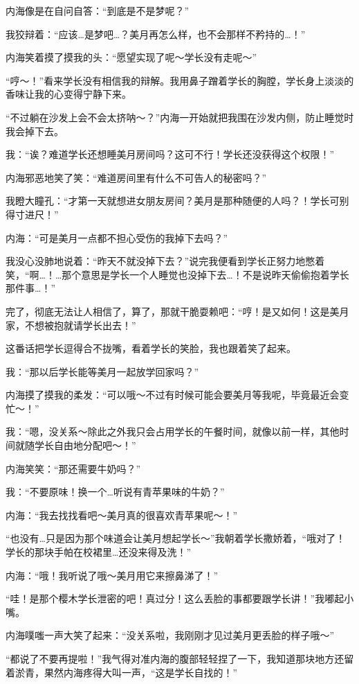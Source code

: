 内海像是在自问自答：“到底是不是梦呢？”

我狡辩着：“应该…是梦吧…？美月再怎么样，也不会那样不矜持的…！”

内海笑着摸了摸我的头：“愿望实现了呢～学长没有走呢～”

“哼～！”看来学长没有相信我的辩解。我用鼻子蹭着学长的胸膛，学长身上淡淡的香味让我的心变得宁静下来。

“不过躺在沙发上会不会太挤呐～？”内海一开始就把我围在沙发内侧，防止睡觉时我会掉下去。

我：“诶？难道学长还想睡美月房间吗？这可不行！学长还没获得这个权限！”

内海邪恶地笑了笑：“难道房间里有什么不可告人的秘密吗？”

我瞪大瞳孔：“才第一天就想进女朋友房间？美月是那种随便的人吗？！学长可别得寸进尺！”

内海：“可是美月一点都不担心受伤的我掉下去吗？”

我没心没肺地说着：“昨天不就没掉下去？”说完我便看到学长正努力地憋着笑，“啊…！…那个意思是学长一个人睡觉也没掉下去…！不是说昨天偷偷抱着学长那件事…！”

完了，彻底无法让人相信了，算了，那就干脆耍赖吧：“哼！是又如何！这是美月家，不想被抱就请学长出去！”

这番话把学长逗得合不拢嘴，看着学长的笑脸，我也跟着笑了起来。

我：“那以后学长能等美月一起放学回家吗？”

内海摸了摸我的柔发：“可以哦～不过有时候可能会要美月等我呢，毕竟最近会变忙～！”

我：“嗯，没关系～除此之外我只会占用学长的午餐时间，就像以前一样，其他时间就随学长自由地分配吧～！”

内海笑笑：“那还需要牛奶吗？”

我：“不要原味！换一个…听说有青苹果味的牛奶？”

内海：“我去找找看吧～美月真的很喜欢青苹果呢～！”

“也没有…只是因为那个味道会让美月想起学长～”我朝着学长撒娇着，“哦对了！学长的那块手帕在校裙里…还没来得及洗！”

内海：“哦！我听说了哦～美月用它来擦鼻涕了！”

“哇！是那个樱木学长泄密的吧！真过分！这么丢脸的事都要跟学长讲！”我嘟起小嘴。

内海噗嗤一声大笑了起来：“没关系啦，我刚刚才见过美月更丢脸的样子哦～”

“都说了不要再提啦！”我气得对准内海的腹部轻轻捏了一下，我知道那块地方还留着淤青，果然内海疼得大叫一声，“这是学长自找的！”

